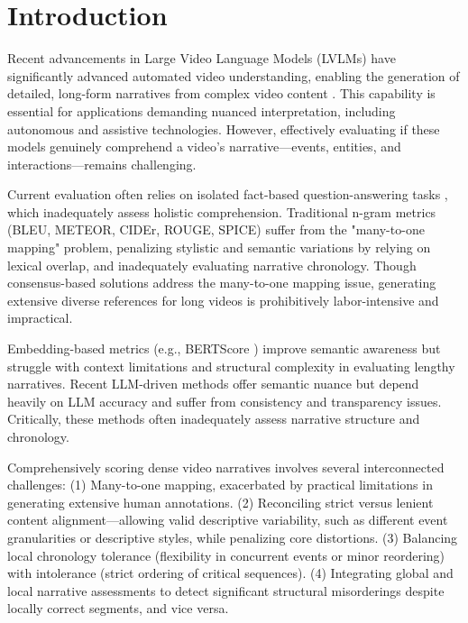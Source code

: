 \section{Introduction}

Recent advancements in Large Video Language Models (LVLMs) have significantly advanced automated video understanding, enabling the generation of detailed, long-form narratives from complex video content \cite{he2024ma, chen2024far, achiam2023gpt, cheng2024videollama, ataallah2024goldfish, li2024llava, liu2024st, zhang2023video, lin2023video, ye2024mplug, yao2024minicpm}. This capability is essential for applications demanding nuanced interpretation, including autonomous and assistive technologies. However, effectively evaluating if these models genuinely comprehend a video's narrative—events, entities, and interactions—remains challenging.

Current evaluation often relies on isolated fact-based question-answering tasks \cite{zhou2024mlvu, tapaswi2016movieqa, wang2024lvbench, ataallah2024goldfish, fu2024video,li2024llava, nagrani2024neptune, li2024mvbench, rawal2024cinepile, ataallah2024infinibench, wu2024longvideobench, tan2025allvb}, which inadequately assess holistic comprehension. Traditional n-gram metrics (BLEU, METEOR, CIDEr, ROUGE, SPICE) \cite{papineni2002bleu, banerjee2005meteor, vedantam2015cider, lin2004rouge, anderson2016spice} suffer from the "many-to-one mapping" problem, penalizing stylistic and semantic variations by relying on lexical overlap, and inadequately evaluating narrative chronology. Though consensus-based solutions address the many-to-one mapping issue, generating extensive diverse references for long videos is prohibitively labor-intensive and impractical.

Embedding-based metrics (e.g., BERTScore \cite{zhang2019bertscore}) improve semantic awareness but struggle with context limitations and structural complexity in evaluating lengthy narratives. Recent LLM-driven methods \cite{wang2024tarsier, dubey2025leveraging, maaz2023video} offer semantic nuance but depend heavily on LLM accuracy and suffer from consistency and transparency issues. Critically, these methods often inadequately assess narrative structure and chronology.

Comprehensively scoring dense video narratives involves several interconnected challenges: (1) Many-to-one mapping, exacerbated by practical limitations in generating extensive human annotations. (2) Reconciling strict versus lenient content alignment—allowing valid descriptive variability, such as different event granularities or descriptive styles, while penalizing core distortions. (3) Balancing local chronology tolerance (flexibility in concurrent events or minor reordering) with intolerance (strict ordering of critical sequences). (4) Integrating global and local narrative assessments to detect significant structural misorderings despite locally correct segments, and vice versa.

